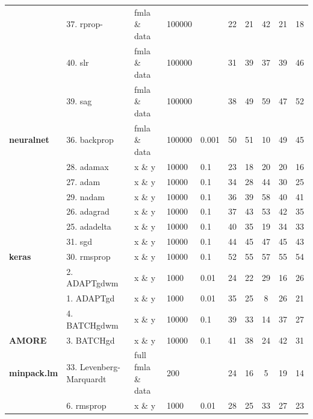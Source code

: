 \begin{Schunk}
\begin{table}[!h]
\begin{tabular}[t]{>{}lllllccccc}
 & 37. rprop- & fmla \& data & 100000 &  & 22 & 21 & 42 & 21 & 18\\

 & 40. slr & fmla \& data & 100000 &  & 31 & 39 & 37 & 39 & 46\\

 & 39. sag & fmla \& data & 100000 &  & 38 & 49 & 59 & 47 & 52\\

\multirow{-5}{*}{\raggedright\arraybackslash \textbf{neuralnet}} & 36. backprop & fmla \& data & 100000 & 0.001 & 50 & 51 & 10 & 49 & 45\\
\cmidrule{1-10}
 & 28. adamax & x \& y & 10000 & 0.1 & 23 & 18 & 20 & 20 & 16\\

 & 27. adam & x \& y & 10000 & 0.1 & 34 & 28 & 44 & 30 & 25\\

 & 29. nadam & x \& y & 10000 & 0.1 & 36 & 39 & 58 & 40 & 41\\

 & 26. adagrad & x \& y & 10000 & 0.1 & 37 & 43 & 53 & 42 & 35\\

 & 25. adadelta & x \& y & 10000 & 0.1 & 40 & 35 & 19 & 34 & 33\\

 & 31. sgd & x \& y & 10000 & 0.1 & 44 & 45 & 47 & 45 & 43\\

\multirow{-7}{*}{\raggedright\arraybackslash \textbf{keras}} & 30. rmsprop & x \& y & 10000 & 0.1 & 52 & 55 & 57 & 55 & 54\\
\cmidrule{1-10}
 & 2. ADAPTgdwm & x \& y & 1000 & 0.01 & 24 & 22 & 29 & 16 & 26\\

 & 1. ADAPTgd & x \& y & 1000 & 0.01 & 35 & 25 & 8 & 26 & 21\\

 & 4. BATCHgdwm & x \& y & 10000 & 0.1 & 39 & 33 & 14 & 37 & 27\\

\multirow{-4}{*}{\raggedright\arraybackslash \textbf{AMORE}} & 3. BATCHgd & x \& y & 10000 & 0.1 & 41 & 38 & 24 & 42 & 31\\
\cmidrule{1-10}
\textbf{minpack.lm} & 33. Levenberg-Marquardt & full fmla \& data & 200 &  & 24 & 16 & 5 & 19 & 14\\
\cmidrule{1-10}
 & 6. rmsprop & x \& y & 1000 & 0.01 & 28 & 25 & 33 & 27 & 23\\


\end{tabular}
\end{table}
\end{Schunk}
